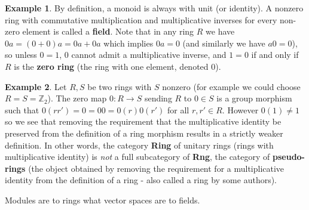 \documentclass[a4paper,12pt,parskip=half*,chapterprefix=true,numbers=noendperiod]{scrreprt}
\theoremstyle{definition}
\newtheorem{example}{Example}[section]
\theoremstyle{remark}
\begin{document}
\begin{example}
	By definition, a monoid is always with unit (or identity). A nonzero ring with commutative multiplication and multiplicative inverses for every non-zero element is called a \textbf{field}. Note that in any ring $R$ we have $0a=(0+0)a=0a+0a$ which implies $0a=0$ (and similarly we have $a0=0$), so unless $0=1$, $0$ cannot admit a multiplicative inverse, and $1=0$ if and only if $R$ is the \textbf{zero ring} (the ring with one element, denoted $0$).
\end{example}
\begin{example}
	Let $R,S$ be two rings with $S$ nonzero (for example we could choose $R=S=\mathbb{Z}_2$). The zero map $0:R\to S$ sending $R$ to $0\in S$ is a group morphism such that $0(rr')=0=00=0(r)0(r')$ for all $r,r'\in R$. However $0(1)\neq 1$ so we see that removing the requirement that the multiplicative identity be preserved from the definition of a ring morphism results in a strictly weaker definition. In other words, the category \textbf{Ring} of unitary rings (rings with multiplicative identity) is \emph{not} a full subcategory of \textbf{Rng}, the category of \textbf{pseudo-rings} (the object obtained by removing the requirement for a multiplicative identity from the definition of a ring - also called a ring by some authors).
\end{example}

Modules are to rings what vector spaces are to fields.
\end{document}
